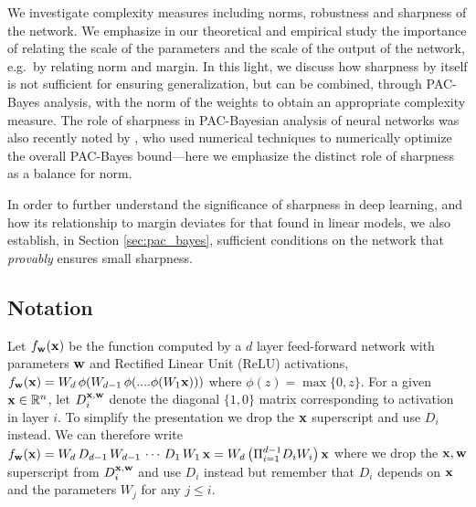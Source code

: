 \documentclass{article}
\begin{document}
 
We investigate complexity measures including norms, robustness and
sharpness of the network.  We emphasize in our theoretical and
empirical study the importance of relating the scale of the parameters
and the scale of the output of the network, e.g.~by relating norm and
margin.  In this light, we discuss how sharpness by itself is not
sufficient for ensuring generalization, but can be combined, through
PAC-Bayes analysis, with the norm of the weights to obtain an
appropriate complexity measure.  The role of sharpness in
PAC-Bayesian analysis of neural networks was also recently noted by
\citet{dziugaite2017computing}, who used numerical techniques to
numerically optimize the overall PAC-Bayes bound---here we emphasize
the distinct role of sharpness as a balance for norm.


In order to further understand the
significance of sharpness in deep learning, and how its relationship
to margin deviates for that found in linear models, we also establish,
in Section \ref{sec:pac_bayes}, sufficient conditions on the network
that {\em provably} ensures small sharpness.


\subsection*{Notation}
Let $f_{\mathbf{w}}(\mathbf{x})$ be the function computed by a $d$ layer
feed-forward network with parameters $\mathbf{w}$ and Rectified Linear Unit
(ReLU) activations, $f_{\mathbf{w}}(\mathbf{x}) =
W_d\,\phi(W_{d-1}\,\phi(....\phi(W_1 \mathbf{x} ) ) )$ where
$\phi(z)=\max\{0,z\}$. For a given $\mathbf{x} \in \mathbb{R}^n$, let
$D^{\mathbf{x},\mathbf{w}}_i$ denote the diagonal $\{1,0\}$ matrix corresponding
to activation in layer $i$. To simplify the presentation we drop the
$\mathbf{x}$ superscript and use $D_i$ instead. We can therefore write
$f_{\mathbf{w}}(\mathbf{x}) = W_d\,D_{d-1}\,W_{d-1}\,\cdots \,D_1\,W_1\,\mathbf{x} =
W_d\left(\Pi_{i=1}^{d-1} D_{i}W_i \right)\mathbf{x}$ where we drop the
${\mathbf{x},\mathbf{w}}$ superscript from $D_i^{\mathbf{x},\mathbf{w}}$ and use $D_i$
instead but remember that $D_i$ depends on $\mathbf{x}$ and the parameters $W_j$ for any $j\leq i$.
\end{document}
